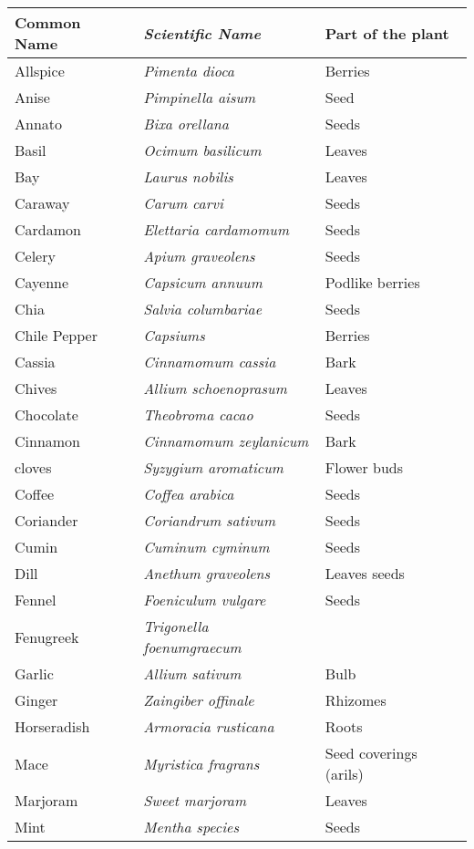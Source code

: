 \pagestyle{empty}
{\newpage
\clearpage
\samepage \begin{tabular}{|l| >{\em} l|l|}
\hline
\textbf{Common Name} & \textbf{Scientific Name} & \textbf{Part of the plant}\\ 
\hline\hline
Allspice &  Pimenta dioca & Berries \\ 
Anise & Pimpinella aisum & Seed \\ 
Annato & Bixa orellana &  Seeds \\ 
Basil & Ocimum basilicum &  Leaves \\ 
Bay &  Laurus nobilis & Leaves \\ 
Caraway & Carum carvi & Seeds \\ 
Cardamon & Elettaria cardamomum & Seeds \\ 
Celery & Apium graveolens &  Seeds \\ 
Cayenne & Capsicum annuum &  Podlike berries \\ 
Chia & Salvia columbariae & Seeds \\ 
Chile Pepper & Capsiums & Berries \\ 
Cassia & Cinnamomum cassia & Bark \\ 
Chives & Allium schoenoprasum & Leaves \\ 
Chocolate & Theobroma cacao &  Seeds \\ 
Cinnamon & Cinnamomum zeylanicum & Bark \\ 
cloves & Syzygium aromaticum & Flower buds \\ 
Coffee & Coffea arabica & Seeds \\ 
Coriander & Coriandrum sativum & Seeds \\ 
Cumin &  Cuminum cyminum &  Seeds \\ 
Dill &  Anethum graveolens & Leaves seeds \\ 
Fennel &  Foeniculum vulgare & Seeds \\ 
Fenugreek & Trigonella foenumgraecum \\ 
Garlic & Allium sativum & Bulb \\ 
Ginger & Zaingiber offinale & Rhizomes \\ 
Horseradish & Armoracia rusticana & Roots \\ 
Mace & Myristica fragrans & Seed coverings (arils) \\ 
Marjoram & Sweet marjoram & Leaves \\ 
Mint & Mentha species & Seeds \\ 

\end{tabular}}
